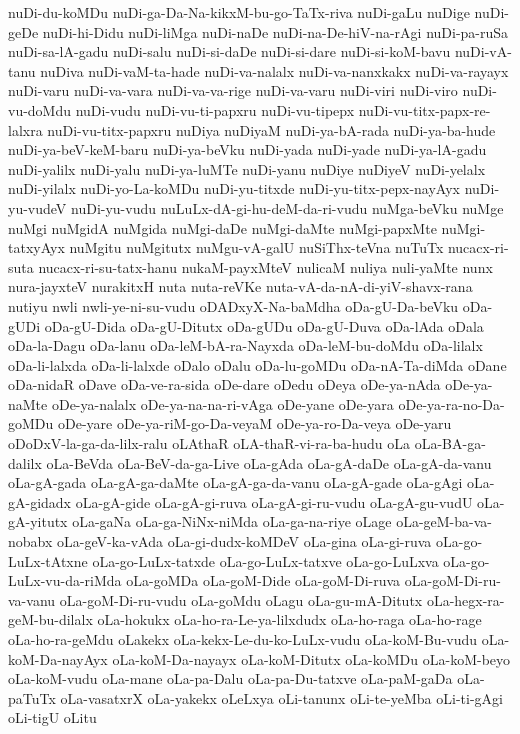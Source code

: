 {nuDi-du-koMDu
nuDi-ga-Da-Na-kikxM-bu-go-TaTx-riva
nuDi-gaLu
nuDige
nuDi-geDe
nuDi-hi-Didu
nuDi-liMga
nuDi-naDe
nuDi-na-De-hiV-na-rAgi
nuDi-pa-ruSa
nuDi-sa-lA-gadu
nuDi-salu
nuDi-si-daDe
nuDi-si-dare
nuDi-si-koM-bavu
nuDi-vA-tanu
nuDiva
nuDi-vaM-ta-hade
nuDi-va-nalalx
nuDi-va-nanxkakx
nuDi-va-rayayx
nuDi-varu
nuDi-va-vara
nuDi-va-va-rige
nuDi-va-varu
nuDi-viri
nuDi-viro
nuDi-vu-doMdu
nuDi-vudu
nuDi-vu-ti-papxru
nuDi-vu-tipepx
nuDi-vu-titx-papx-re-lalxra
nuDi-vu-titx-papxru
nuDiya
nuDiyaM
nuDi-ya-bA-rada
nuDi-ya-ba-hude
nuDi-ya-beV-keM-baru
nuDi-ya-beVku
nuDi-yada
nuDi-yade
nuDi-ya-lA-gadu
nuDi-yalilx
nuDi-yalu
nuDi-ya-luMTe
nuDi-yanu
nuDiye
nuDiyeV
nuDi-yelalx
nuDi-yilalx
nuDi-yo-La-koMDu
nuDi-yu-titxde
nuDi-yu-titx-pepx-nayAyx
nuDi-yu-vudeV
nuDi-yu-vudu
nuLuLx-dA-gi-hu-deM-da-ri-vudu
nuMga-beVku
nuMge
nuMgi
nuMgidA
nuMgida
nuMgi-daDe
nuMgi-daMte
nuMgi-papxMte
nuMgi-tatxyAyx
nuMgitu
nuMgitutx
nuMgu-vA-galU
nuSiThx-teVna
nuTuTx
nucacx-ri-suta
nucacx-ri-su-tatx-hanu
nukaM-payxMteV
nulicaM
nuliya
nuli-yaMte
nunx
nura-jayxteV
nurakitxH
nuta
nuta-reVKe
nuta-vA-da-nA-di-yiV-shavx-rana
nutiyu
nwli
nwli-ye-ni-su-vudu
oDADxyX-Na-baMdha
oDa-gU-Da-beVku
oDa-gUDi
oDa-gU-Dida
oDa-gU-Ditutx
oDa-gUDu
oDa-gU-Duva
oDa-lAda
oDala
oDa-la-Dagu
oDa-lanu
oDa-leM-bA-ra-Nayxda
oDa-leM-bu-doMdu
oDa-lilalx
oDa-li-lalxda
oDa-li-lalxde
oDalo
oDalu
oDa-lu-goMDu
oDa-nA-Ta-diMda
oDane
oDa-nidaR
oDave
oDa-ve-ra-sida
oDe-dare
oDedu
oDeya
oDe-ya-nAda
oDe-ya-naMte
oDe-ya-nalalx
oDe-ya-na-na-ri-vAga
oDe-yane
oDe-yara
oDe-ya-ra-no-Da-goMDu
oDe-yare
oDe-ya-riM-go-Da-veyaM
oDe-ya-ro-Da-veya
oDe-yaru
oDoDxV-la-ga-da-lilx-ralu
oLAthaR
oLA-thaR-vi-ra-ba-hudu
oLa
oLa-BA-ga-dalilx
oLa-BeVda
oLa-BeV-da-ga-Live
oLa-gAda
oLa-gA-daDe
oLa-gA-da-vanu
oLa-gA-gada
oLa-gA-ga-daMte
oLa-gA-ga-da-vanu
oLa-gA-gade
oLa-gAgi
oLa-gA-gidadx
oLa-gA-gide
oLa-gA-gi-ruva
oLa-gA-gi-ru-vudu
oLa-gA-gu-vudU
oLa-gA-yitutx
oLa-gaNa
oLa-ga-NiNx-niMda
oLa-ga-na-riye
oLage
oLa-geM-ba-va-nobabx
oLa-geV-ka-vAda
oLa-gi-dudx-koMDeV
oLa-gina
oLa-gi-ruva
oLa-go-LuLx-tAtxne
oLa-go-LuLx-tatxde
oLa-go-LuLx-tatxve
oLa-go-LuLxva
oLa-go-LuLx-vu-da-riMda
oLa-goMDa
oLa-goM-Dide
oLa-goM-Di-ruva
oLa-goM-Di-ru-va-vanu
oLa-goM-Di-ru-vudu
oLa-goMdu
oLagu
oLa-gu-mA-Ditutx
oLa-hegx-ra-geM-bu-dilalx
oLa-hokukx
oLa-ho-ra-Le-ya-lilxdudx
oLa-ho-raga
oLa-ho-rage
oLa-ho-ra-geMdu
oLakekx
oLa-kekx-Le-du-ko-LuLx-vudu
oLa-koM-Bu-vudu
oLa-koM-Da-nayAyx
oLa-koM-Da-nayayx
oLa-koM-Ditutx
oLa-koMDu
oLa-koM-beyo
oLa-koM-vudu
oLa-mane
oLa-pa-Dalu
oLa-pa-Du-tatxve
oLa-paM-gaDa
oLa-paTuTx
oLa-vasatxrX
oLa-yakekx
oLeLxya
oLi-tanunx
oLi-te-yeMba
oLi-ti-gAgi
oLi-tigU
oLitu
}
